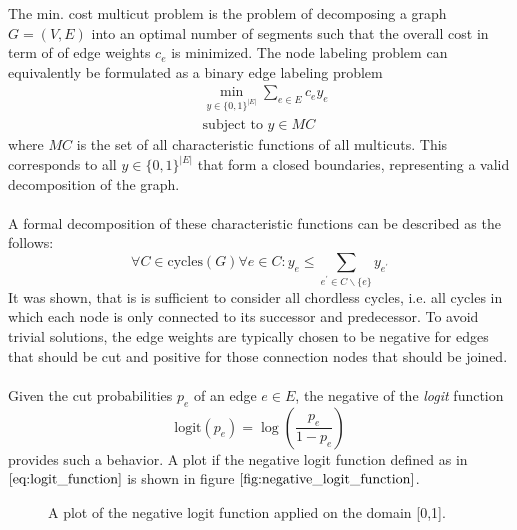 The min. cost multicut problem is the problem of decomposing a graph $G = (V, E)$ into an optimal number of segments such that the overall cost in term of of edge weights $c_e$ is minimized. The node labeling problem can equivalently be formulated as a binary edge labeling problem
\begin{equation}
\begin{aligned}
& \min_{y \in \{0,1 \}^{|E|}} \sum_{e \in E} c_e y_e \\
& \text{subject to } y \in MC
\end{aligned}
\end{equation}
where $MC$ is the set of all characteristic functions of all multicuts. This corresponds to all $y \in \{0,1 \}^{|E|}$ that form a closed boundaries, representing a valid decomposition of the graph. \\ \\
A formal decomposition of these characteristic functions can be described as the follows:
\begin{equation}
	\forall C \in \text{cycles}(G) \forall e \in C: y_e \leq \sum_{e^{'} \in C \backslash \{e\}} y_{e^{'}}
\end{equation}
It was shown, that is is sufficient to consider all chordless cycles, i.e. all cycles in which each node is only connected to its successor and predecessor. To avoid trivial solutions, the edge weights are typically chosen to be negative for edges that should be cut and positive for those connection nodes that should be joined. \\ \\
Given the cut probabilities $p_e$ of an edge $e \in E$, the negative of the \textit{logit} function 
\begin{equation}
	\text{logit}\left( p_e \right) = \log \left( \frac{p_e}{1 - p_e} \right)
	\label{eq:logit_function}
\end{equation}
provides such a behavior. A plot if the negative logit function defined as in $\ref{eq:logit_function}$ is shown in figure $\ref{fig:negative_logit_function}$.
\begin{figure}
\centering
{}
\caption[Logit Function Plot]{A plot of the negative logit function applied on the domain [0,1].}
\label{fig:negative_logit_function}
\end{figure}
